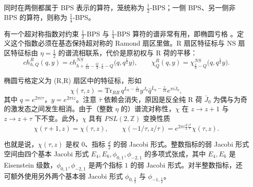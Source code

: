 
同时在两侧都属于 BPS 表示的算符，笼统称为 $\frac12$-BPS；一侧 BPS、另一侧非 BPS 的算符，则称为 $\frac14$-BPS。

有一个超对称指数对约束 $\frac12$-BPS 与 $\frac14$-BPS 算符的谱非常有用，即椭圆亏格 \cite{r34}。定义这个指数必须在基态保持超对称的 Ramond 扇区里做。R 扇区特征标与 NS 扇区特征标由 $\eta=\frac12$ 的谱流相联系，代价是原初权与 R 荷的平移：
\begin{equation}
  \label{eq:4-38}
  ch^{R}_{h,Q}(q,y)=ch^{NS}_{h+\frac c{24}-\frac Q2,\frac c6-Q}\big(q,q^{\frac12}y\big),\qquad
  \chi^{R}_Q(q,y)=\chi^{NS}_{\frac c6-Q}\big(q,q^{\frac12}y\big).
\end{equation}

椭圆亏格定义为 (R,R) 扇区中的特征标，形如
\begin{equation}
  \label{eq:4-39}
  \chi(\tau,z)=\mathrm{Tr}_{RR}\,q^{L_0-\frac c{24}}y^{J_0}\bar q^{\bar L_0-\frac c{24}}e^{\pi i\bar J_0},
\end{equation}
其中 $q=e^{2\pi i\tau}$，$y=e^{2\pi iz}$。注意 $\bar\tau$ 依赖会消失，原因是反全纯 R 荷 $\bar J_0$ 为偶与为奇的激发态之间发生相消。由于（整数 $\eta$ 的）谱流对称性，$\chi$ 在 $z\to z+1$ 与 $z\to z+\tau$ 下不变。此外，$\chi$ 具有 $PSL(2,\mathbb{Z})$ 变换性质
\begin{equation}
  \label{eq:4-40}
  \chi(\tau+1,z)=\chi(\tau,z),\qquad
  \chi(-1/\tau,z/\tau)=e^{2\pi i\frac d2\frac{z^2}{\tau}}\chi(\tau,z).
\end{equation}


也就是说，$\chi(\tau,z)$ 是权 $0$、指标 $\frac d2$ 的弱 Jacobi 形式。整数指标的弱 Jacobi 形式空间由四个基本 Jacobi 形式 $E_4,E_6,\phi_{0,1},\phi_{-2,1}$ 的多项式张成，其中 $E_4,E_6$ 是 Eisenstein 级数，$\phi_{0,1},\phi_{-2,1}$ 是两个指标 $1$ 的弱 Jacobi 形式。对半整数指标，还可额外使用另外两个基本弱 Jacobi 形式 $\phi_{0,\frac32}$ 与 $\phi_{-1,\frac12}$。

